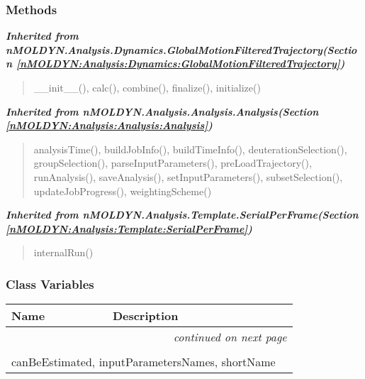 
  \subsubsection{Methods}


\large{\textbf{\textit{Inherited from nMOLDYN.Analysis.Dynamics.GlobalMotionFilteredTrajectory\textit{(Section \ref{nMOLDYN:Analysis:Dynamics:GlobalMotionFilteredTrajectory})}}}}

\begin{quote}
\_\_init\_\_(), calc(), combine(), finalize(), initialize()
\end{quote}

\large{\textbf{\textit{Inherited from nMOLDYN.Analysis.Analysis.Analysis\textit{(Section \ref{nMOLDYN:Analysis:Analysis:Analysis})}}}}

\begin{quote}
analysisTime(), buildJobInfo(), buildTimeInfo(), deuterationSelection(), groupSelection(), parseInputParameters(), preLoadTrajectory(), runAnalysis(), saveAnalysis(), setInputParameters(), subsetSelection(), updateJobProgress(), weightingScheme()
\end{quote}

\large{\textbf{\textit{Inherited from nMOLDYN.Analysis.Template.SerialPerFrame\textit{(Section \ref{nMOLDYN:Analysis:Template:SerialPerFrame})}}}}

\begin{quote}
internalRun()
\end{quote}


  \subsubsection{Class Variables}

    \vspace{-1cm}
\hspace{\varindent}\begin{longtable}{|p{\varnamewidth}|p{\vardescrwidth}|l}
\cline{1-2}
\cline{1-2} \centering \textbf{Name} & \centering \textbf{Description}& \\
\cline{1-2}
\endhead\cline{1-2}\multicolumn{3}{r}{\small\textit{continued on next page}}\\\endfoot\cline{1-2}
\endlastfoot\multicolumn{2}{|l|}{\textit{Inherited from nMOLDYN.Analysis.Dynamics.GlobalMotionFilteredTrajectory \textit{(Section \ref{nMOLDYN:Analysis:Dynamics:GlobalMotionFilteredTrajectory})}}}\\
\multicolumn{2}{|p{\varwidth}|}{\raggedright canBeEstimated, inputParametersNames, shortName}\\
\cline{1-2}
\end{longtable}

